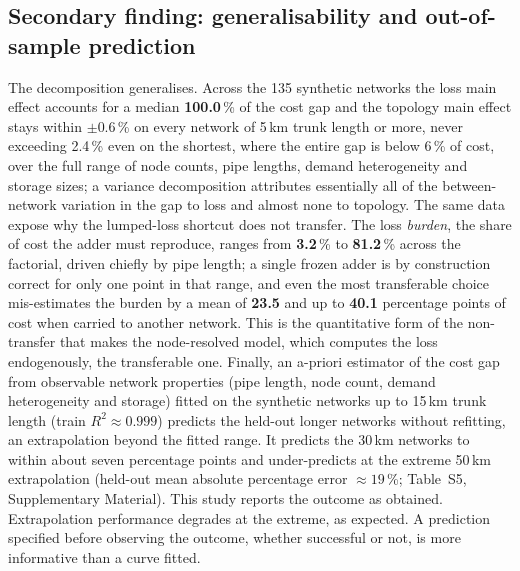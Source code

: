 \documentclass[a4paper,fleqn]{cas-sc}
\begin{document}
\subsection{Secondary finding: generalisability and out-of-sample prediction}
\label{subsec:generalis}
The decomposition generalises. Across the 135 synthetic networks the loss main effect
accounts for a median \textbf{100.0}\,\% of the cost gap and the topology main
effect stays within $\pm$0.6\,\% on every network of 5\,km trunk length or more, never exceeding 2.4\,\% even on the shortest, where the entire gap is below 6\,\% of cost, over the full range of
node counts, pipe lengths, demand heterogeneity and storage sizes; a variance decomposition
attributes essentially all of the between-network variation in the gap to loss and almost none
to topology. The same data expose why the lumped-loss shortcut does not transfer. The loss
\emph{burden}, the share of cost the adder must reproduce, ranges from
\textbf{3.2}\,\% to \textbf{81.2}\,\% across the factorial, driven
chiefly by pipe length; a single frozen adder is by construction correct for only one point in
that range, and even the most transferable choice mis-estimates the burden by a mean of
\textbf{23.5} and up to \textbf{40.1} percentage points of cost
when carried to another network. This is the quantitative form of the non-transfer that makes
the node-resolved model, which computes the loss endogenously, the transferable one. Finally,
an a-priori estimator of the cost gap from observable network properties (pipe length, node
count, demand heterogeneity and storage) fitted on the synthetic networks up to 15\,km trunk
length (train $R^2\approx0.999$) predicts the held-out longer networks without refitting, an
extrapolation beyond the fitted range. It predicts the 30\,km networks to within about seven
percentage points and under-predicts at the extreme 50\,km extrapolation (held-out mean absolute
percentage error $\approx19$\,\%; Table~S5, Supplementary Material). This study reports the outcome as obtained. Extrapolation performance degrades
at the extreme, as expected. A prediction specified before observing the outcome,
whether successful or not, is more informative than a curve fitted.
\end{document}
